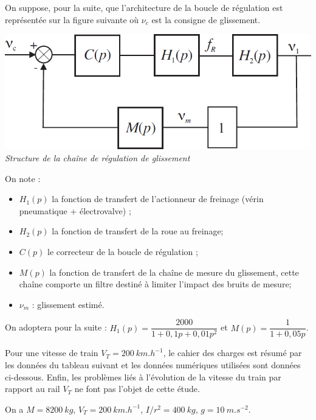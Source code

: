\documentclass[10pt,fleqn]{article} %
\begin{document}
\begin{multicols}{2}
On suppose, pour la suite, que l’architecture de la boucle de régulation est représentée sur la figure suivante où $\nu_c$ est la consigne de glissement.

\begin{center}
\includegraphics[width=\linewidth]{images/fig_02}
\textit{Structure de la chaîne de régulation de glissement}
\end{center}

On note : 
\begin{itemize}
\item $H_1(p)$ la fonction de transfert de l’actionneur de freinage (vérin pneumatique + électrovalve) ;
\item $H_2(p)$ la fonction de transfert de la roue au freinage;
\item $C(p)$ le correcteur de la boucle de régulation ;
\item $M(p)$ la fonction de transfert de la chaîne de mesure du glissement,%
 cette chaîne comporte un filtre destiné à limiter l’impact des bruits de mesure;
\item $\nu_m$ : glissement estimé.%
\end{itemize}
On adoptera pour la suite : $H_1(p)=\dfrac{2000}{1+0,1p+0,01p^2}$ et $M(p)=\dfrac{1}{1+0,05p}$.

Pour une vitesse de train $V_T=\SI{200}{km.h^{-1}}$, le cahier des charges est résumé par les données du tableau suivant et les données numériques utilisées sont données ci-dessous.
Enfin, les problèmes liés à l’évolution de la vitesse du train par rapport au rail $V_T$ ne font pas l’objet de cette étude.

On a $M=\SI{8200}{kg}$, $V_T=\SI{200}{km.h^{-1}}$, $I/r^2=\SI{400}{kg}$, $g=\SI{10}{m.s^{-2}}$.


\end{multicols}
\end{document}
